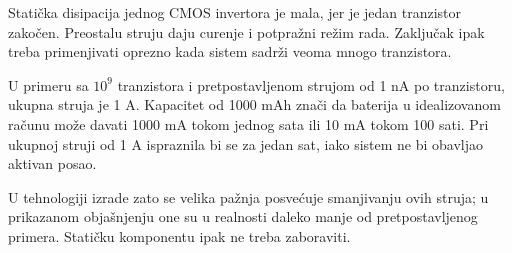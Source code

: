 Statička disipacija jednog CMOS invertora je mala, jer je jedan tranzistor zakočen. Preostalu struju daju curenje i potpražni režim rada. Zaključak ipak treba primenjivati oprezno kada sistem sadrži veoma mnogo tranzistora.

U primeru sa $10^9$ tranzistora i pretpostavljenom strujom od 1 nA po tranzistoru, ukupna struja je 1 A. Kapacitet od 1000 mAh znači da baterija u idealizovanom računu može davati 1000 mA tokom jednog sata ili 10 mA tokom 100 sati. Pri ukupnoj struji od 1 A ispraznila bi se za jedan sat, iako sistem ne bi obavljao aktivan posao.

U tehnologiji izrade zato se velika pažnja posvećuje smanjivanju ovih struja; u prikazanom objašnjenju one su u realnosti daleko manje od pretpostavljenog primera. Statičku komponentu ipak ne treba zaboraviti.
